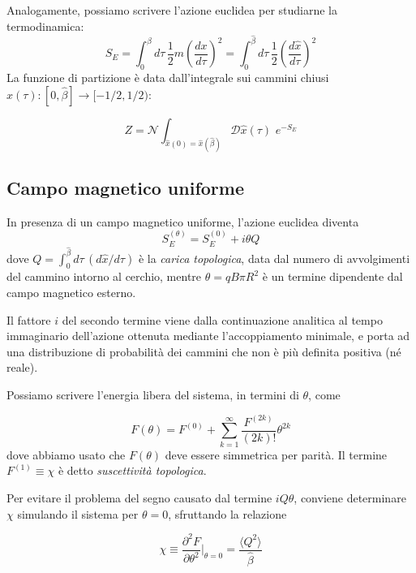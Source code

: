 \documentclass[a4paper,11pt]{article}
\newcommand{\avg}[1]{\langle {#1} \rangle}
\begin{document}
    Analogamente, possiamo scrivere l'azione euclidea per studiarne la termodinamica:
    \begin{equation}
        S_E = \int_0^\beta d\tau \, \frac{1}{2} m \left(\frac{dx}{d\tau}\right)^2 = \int_0^{\hat{\beta}} d\tau \, \frac{1}{2} \left( \frac{d\hat{x}}{d\tau}\right)^2
    \end{equation}
    La funzione di partizione è data dall'integrale sui cammini chiusi $\hat{x}(\tau): [0, \hat{\beta}] \to [-1/2, 1/2)$:
    
    \begin{equation}
        Z = \mathcal{N} \int_{\hat{x}(0) = \hat{x}(\hat{\beta})} \mathcal{D}\hat{x}(\tau) \, \,e^{-S_E}
    \end{equation}

    \subsection{Campo magnetico uniforme}
    In presenza di un campo magnetico uniforme, l'azione euclidea diventa
    \begin{equation}
        S^{(\theta)}_E = S^{(0)}_E + i\theta Q
    \end{equation}
    dove $Q = \int_0^{\hat{\beta}} d\tau \, ({d\hat{x}} / {d\tau})$ è la \emph{carica topologica}, data dal numero di avvolgimenti del cammino intorno al cerchio, mentre $\theta = qB\pi R^2$ è un termine dipendente dal campo magnetico esterno. 
    
    Il fattore $i$ del secondo termine viene dalla continuazione analitica al tempo immaginario dell'azione ottenuta mediante l'accoppiamento minimale, e porta ad una distribuzione di probabilità dei cammini che non è più definita positiva (né reale). 
    
    Possiamo scrivere l'energia libera del sistema, in termini di $\theta$, come
    
    \begin{equation}
        F(\theta) = F^{(0)} + \sum_{k=1}^{\infty} \frac{F^{(2k)}}{(2k)!} \theta^{2k}
    \end{equation}
    dove abbiamo usato che $F(\theta)$ deve essere simmetrica per parità. Il termine $F^{(1)} \equiv \chi$ è detto \emph{suscettività topologica}.
    
    Per evitare il problema del segno causato dal termine $iQ\theta$, conviene determinare $\chi$ simulando il sistema per $\theta = 0$, sfruttando la relazione
    
    \begin{equation}
        \chi \equiv \frac{\partial^2 F}{\partial \theta^2} \bigg\rvert_{\theta = 0} = \frac{\avg{Q^2}}{
        \hat{\beta}}
    \end{equation}
    
\end{document}
